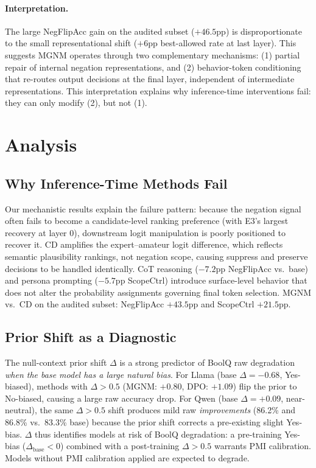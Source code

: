 \documentclass[letterpaper]{article}
\begin{document}
\paragraph{Interpretation.}
The large NegFlipAcc gain on the audited subset ($+46.5$pp) is disproportionate to the small
representational shift ($+6$pp best-allowed rate at last layer).
This suggests MGNM operates through two complementary mechanisms:
(1) partial repair of internal negation representations, and
(2) behavior-token conditioning that re-routes output decisions at
the final layer, independent of intermediate representations.
This interpretation explains why inference-time interventions fail:
they can only modify (2), but not (1).

\section{Analysis}
\label{sec:analysis}

\subsection{Why Inference-Time Methods Fail}

Our mechanistic results explain the failure pattern:
because the negation signal often fails to become a candidate-level ranking
preference (with E3's largest recovery at layer 0), downstream logit
manipulation is poorly positioned to recover it.
CD amplifies the expert--amateur logit difference, which reflects semantic
plausibility rankings, not negation scope, causing suppress and preserve decisions
to be handled identically.
CoT reasoning ($-7.2$pp NegFlipAcc vs.\ base) and persona prompting ($-5.7$pp ScopeCtrl)
introduce surface-level behavior that does not alter the probability assignments
governing final token selection.
MGNM vs.\ CD on the audited subset: NegFlipAcc $+43.5$pp and ScopeCtrl $+21.5$pp.

\subsection{Prior Shift as a Diagnostic}

The null-context prior shift $\Delta$ is a strong predictor of BoolQ raw degradation
\emph{when the base model has a large natural bias}.
For Llama (base $\Delta = -0.68$, Yes-biased), methods with $\Delta > 0.5$ (MGNM: $+0.80$,
DPO: $+1.09$) flip the prior to No-biased, causing a large raw accuracy drop.
For Qwen (base $\Delta = +0.09$, near-neutral), the same $\Delta > 0.5$ shift
produces mild raw \emph{improvements} (86.2\% and 86.8\% vs.\ 83.3\% base)
because the prior shift corrects a pre-existing slight Yes-bias.
$\Delta$ thus identifies models at risk of BoolQ degradation: a pre-training
Yes-bias ($\Delta_\text{base} < 0$) combined with a post-training $\Delta > 0.5$
warrants PMI calibration.
Models without PMI calibration applied are expected to degrade.
\end{document}

